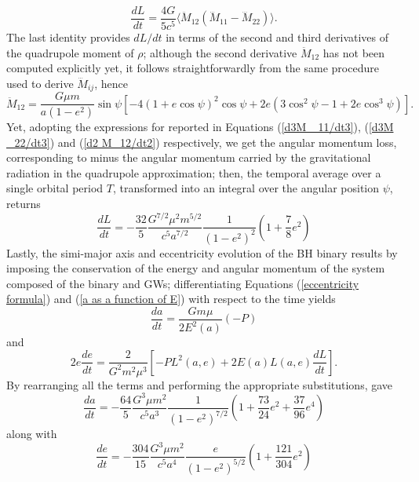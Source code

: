 \documentclass[12pt,twoside,openany]{book}
\begin{document}
\begin{equation}
    \frac{dL}{dt}=\frac{4G}{5c^5}\langle \ddot{M}_{12}(\dddot{M}_{11}-\dddot{M}_{22})\rangle.
\end{equation}
The last identity provides $dL/dt$ in terms of the second and third derivatives of the quadrupole moment of $\rho$; although the second derivative $\ddot{M}_{12}$ has not been computed explicitly yet, it follows straightforwardly from the same procedure used to derive $\dddot{M}_{ij}$, hence
\begin{equation}\label{d2 M_12/dt2}
\ddot{M}_{12}
=
\frac{G \mu m}{a(1 - e^2)} \sin \psi
\left[
-4(1 + e \cos \psi)^2 \cos \psi
+ 2e \left( 3 \cos^2 \psi - 1 + 2e \cos^3 \psi \right)
\right].
\end{equation}
Yet, adopting the expressions for reported in Equations (\ref{d3M _11/dt3}), (\ref{d3M _22/dt3}) and (\ref{d2 M_12/dt2}) respectively, we get the angular momentum loss, corresponding to minus the angular momentum carried by the gravitational radiation in the quadrupole approximation; then, the temporal average over a single orbital period $T$, transformed into an integral over the angular position $\psi$, returns
\begin{equation}
    \frac{dL}{dt}=-\frac{32}{5}\frac{G^{7/2}\mu^2m^{5/2}}{c^5a^{7/2}}\frac{1}{(1-e^2)^2}\left(1+\frac{7}{8}e^2\right)
\end{equation}
Lastly, the simi-major axis and eccentricity evolution of the BH binary results by imposing the conservation of the energy and angular momentum of the system composed of the binary and GWs; differentiating Equations (\ref{eccentricity formula}) and (\ref{a as a function of E}) with respect to the time yields
\begin{equation}
    \frac{da}{dt}=\frac{Gm\mu}{2E^2(a)}(-P)
\end{equation}
and
\begin{equation}
    2e\frac{de}{dt}=\frac{2}{G^2m^2\mu^3}\left[-PL^2(a,e)+2E(a)L(a,e)\frac{dL}{dt}\right].
\end{equation}
By rearranging all the terms and performing the appropriate substitutions, \textcite{Peters_1963} gave 
\begin{equation}\label{da/dt Peterson}
    \frac{da}{dt} = -\frac{64}{5} \frac{G^3 \mu m^2}{c^5 a^3} \frac{1}{(1 - e^2)^{7/2}} \left( 1 + \frac{73}{24}e^2 + \frac{37}{96}e^4 \right)
\end{equation}
along with
\begin{equation}\label{de/dt Peterson}
    \frac{de}{dt} = -\frac{304}{15} \frac{G^3 \mu m^2}{c^5 a^4}  \frac{e}{(1 - e^2)^{5/2}} \left( 1 + \frac{121}{304}e^2 \right)
\end{equation}
\end{document}
